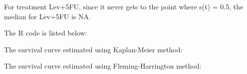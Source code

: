 \documentclass[12pt]{article}
\begin{document}
For treatment Lev+5FU, since it never gets to the point where s(t) =
0.5, the median for Lev+5FU is NA.

\appendix
\appendixpage
\addappheadtotoc

The R code is listed below:



The survival curve estimated using Kaplan-Meier method:



The survival curve estimated using Fleming-Harrington method:


\end{document}
